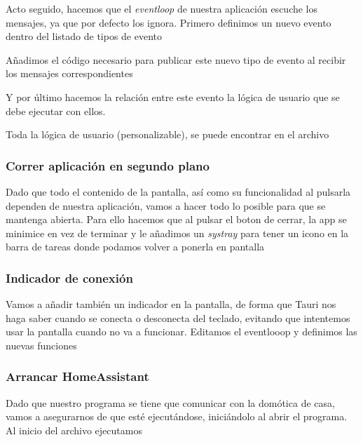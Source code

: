     \newpage
    Acto seguido, hacemos que el \textit{eventloop} de nuestra aplicación escuche los mensajes, ya que por defecto los ignora. Primero definimos un nuevo evento dentro del listado de tipos de evento

    Añadimos el código necesario para publicar este nuevo tipo de evento al recibir los mensajes correspondientes

    Y por último hacemos la relación entre este evento la lógica de usuario que se debe ejecutar con ellos.

    Toda la lógica de usuario (personalizable), se puede encontrar en el archivo \cite{user-rs}



    \newpage
    \subsubsection{Correr aplicación en segundo plano}
    Dado que todo el contenido de la pantalla, así como su funcionalidad al pulsarla dependen de nuestra aplicación, vamos a hacer todo lo posible para que se mantenga abierta. Para ello hacemos que al pulsar el boton de cerrar, la app se minimice en vez de terminar y le añadimos un \textit{systray} para tener un icono en la barra de tareas donde podamos volver a ponerla en pantalla



    \newpage
    \subsubsection{Indicador de conexión}
    Vamos a añadir también un indicador en la pantalla, de forma que Tauri nos haga saber cuando se conecta o desconecta del teclado, evitando que intentemos usar la pantalla cuando no va a funcionar. Editamos el eventlooop y definimos las nuevas funciones



    \subsubsection{Arrancar HomeAssistant}
    Dado que nuestro programa se tiene que comunicar con la domótica de casa, vamos a asegurarnos de que esté ejecutándose, iniciándolo al abrir el programa. Al inicio del archivo  ejecutamos 
